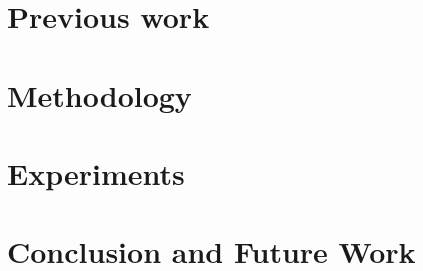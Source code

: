 \documentclass[10pt,twocolumn,letterpaper]{article}
\begin{document}

%

\section{Previous work}
\label{sec_motivtn}



%

%

\section{Methodology}
\label{sec_method}



\section{Experiments}
\label{sec_exp}




\section{Conclusion and Future Work}
\label{sec_con}




{\small


}
\end{document}
